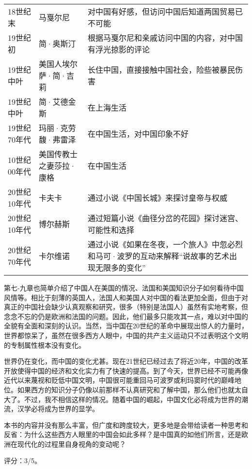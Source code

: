 \begin{longtable}{p{}|p{}|p{}}
18世纪末 & 马戛尔尼 & 对中国有好感，但访问中国后知道两国贸易已不可能 \\ 
19世纪初 & 简·奥斯汀 & 根据马戛尔尼和亲戚访问中国的内容，对中国有浮光掠影的评论 \\
19世纪中叶 & 美国人埃尔萨·简·吉莉 & 长住中国，直接接触中国社会，险些被暴民伤害 \\
19世纪中叶 & 简·艾德金斯 & 在上海生活 \\
19世纪70年代 & 玛丽·克劳馥·弗雷泽 & 在中国生活，对中国印象不好 \\
10世纪00年代 & 美国传教士之妻莎拉·康格 & 在中国生活 \\
20世纪10年代 & 卡夫卡 & 通过小说《中国长城》来探讨皇帝与权威 \\
20世纪10年代 & 博尔赫斯 & 通过短篇小说《曲径分岔的花园》探讨迷宫、可能性和选择 \\
20世纪70年代 & 卡尔维诺 & 通过小说《如果在冬夜，一个旅人》中忽必烈和马可·波罗的互动来解释“说故事的艺术出现无限多的变化” \\
\hline
\end{longtable}

第七-九章也简单介绍了中国人在美国的情况、法国和美国知识分子如何看待中国风情等。相比于刻薄的英国人，法国人和美国人对中国的看法更加全面，但由于对真正的中国社会缺少认真观察和研究，很多（特别是法国人）虽然有实地考察，但念念不忘的仍是欧洲和法国的问题。因此，他们最多只能攻其一点，难以对中国的全貌有全面和深刻的认识。当然，当中国在20世纪的革命中展现出惊人的力量时，世界都惊呆了，虽然在很多西方人眼中，中国的共产主义运动只不过表明这个文明的专制属性根本没有变化。

世界仍在变化，而中国的变化尤甚。现在21世纪已经过去了将近20年，中国的改革开放使得中国的经济和文化实力有了快速的提高。到了今天，世界已经不可能再像近代以来蔑视和贬低中国文明，中国很可能重回马可波罗或利玛窦时代的巅峰地位。如果西方的知识分子仍像以前那样不认真研究和了解中国，那么他们也就太自大了。不过，我不相信这样的情况。随着中国的崛起，中国文化必将成为世界的潮流，汉学必将成为世界的显学。

本书的内容并没有那么丰富，但广度和跨度较大，更多地是会带给读者一种思考和反省：为什么这些西方人眼里的中国会如此多样？是中国真的如他们所言，还是欧洲在现代化的过程里自身视角的变动呢？

评分：3/5。